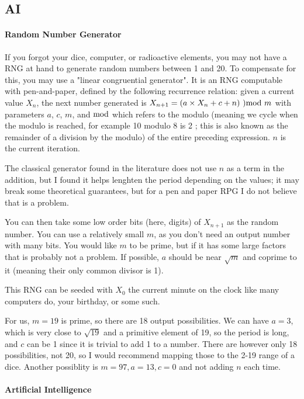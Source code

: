 \subsection{AI}


\paragraph{Random Number Generator}

If you forgot your dice, computer, or radioactive elements, you may not have a RNG at hand to generate random numbers between 1 and 20. To compensate for this, you may use a "linear congruential generator". It is an RNG computable with pen-and-paper, defined by the following recurrence relation: given a current value $X_n$, the next number generated is $X_{n+1}=(a \times X_n + c + n)\ ) \textup{mod}\ m$ with parameters $a$, $c$, $m$, and $\textup{mod}$ which refers to the modulo (meaning we cycle when the modulo is reached, for example 10 modulo 8 is 2 ; this is also known as the remainder of a division by the modulo) of the entire preceding expression. $n$ is the current iteration. 

The classical generator found in the literature does not use $n$ as a term in the addition, but I found it helps lenghten the period depending on the values; it may break some theoretical guarantees, but for a pen and paper RPG I do not believe that is a problem.

You can then take some low order bits (here, digits) of $X_{n+1}$ as the random number. You can use a relatively small $m$, as you don't need an output number with many bits. You would like $m$ to be prime, but if it has some large factors that is probably not a problem. If possible, $a$ should be near $\sqrt{m}$ and coprime to it (meaning their only common divisor is 1). 

This RNG can be seeded with $X_0$ the current minute on the clock like many computers do, your birthday, or some such. 

For us, $m=19$ is prime, so there are 18 output possibilities. We can have $a=3$, which is very close to $\sqrt{19}$ and a primitive element of 19, so the period is long, and $c$ can be 1 since it is trivial to add 1 to a number. There are however only 18 possibilities, not 20, so I would recommend mapping those to the 2-19 range of a dice. Another possiblity is $m=97, a=13, c=0$ and not adding $n$ each time.



\paragraph{Artificial Intelligence}

